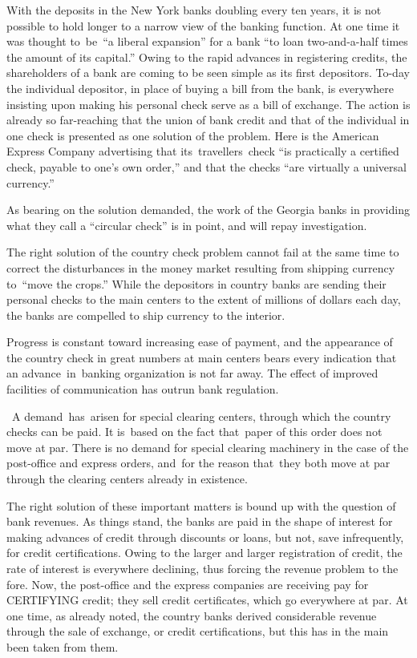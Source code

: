 \documentclass[twoside,symmetric,nobib,justified]{tufte-book}
\begin{document}
With the deposits in the New York banks doubling every ten years, it is
not possible to hold longer to a narrow view of the banking function. At
one time it was thought to~be~``a liberal expansion'' for a bank ``to
loan two-and-a-half times the amount of its capital.'' Owing to the
rapid advances in registering credits, the shareholders of a bank are
coming to be seen simple as its first depositors. To-day the individual
depositor, in place of buying a bill from the bank, is everywhere
insisting upon making his personal check serve as a bill of exchange.
The action is already so far-reaching that the union of bank credit and
that of the individual in one check is presented as one solution of the
problem. Here is the American Express Company advertising that
its~travellers~check ``is practically a certified check, payable to
one's own order,'' and that the checks ``are virtually a universal
currency.'' ~

As bearing on the solution demanded, the work of the Georgia
banks in providing what they call a ``circular check'' is in point, and
will repay investigation.~~

The right solution of the country check problem cannot fail at the same
time to correct the disturbances in the money market resulting from
shipping currency to~``move the crops.'' While the depositors in country
banks are sending their personal checks to the main centers to the
extent of millions of dollars each day, the banks are compelled to ship
currency to the interior.~

Progress is constant toward increasing ease of payment, and the
appearance of the country check in great numbers at main centers bears
every indication that an advance~in~banking organization is not far
away. The effect of improved facilities of communication has outrun bank
regulation.~~

~A demand~has~arisen for special clearing centers, through which the
country checks can be paid. It is~based on the fact that~paper of this
order does not move at par. There is no demand for special clearing
machinery in the case of the post-office and express orders, and~for the
reason that~they both move at par through the clearing centers already
in existence. ~

The right solution of these important matters is bound up with the
question of bank revenues. As things stand, the banks are paid in the
shape of interest for making advances of credit through discounts or
loans, but not, save infrequently, for credit certifications. Owing to
the larger and larger registration of credit, the rate of interest is
everywhere declining, thus forcing the revenue problem to the fore. Now,
the post-office and the express companies are receiving pay for
CERTIFYING credit; they sell credit certificates, which go everywhere at
par. At one time, as already noted, the country banks derived
considerable revenue through the sale of exchange, or credit
certifications, but this has in the main been taken from them.~~
\end{document}
